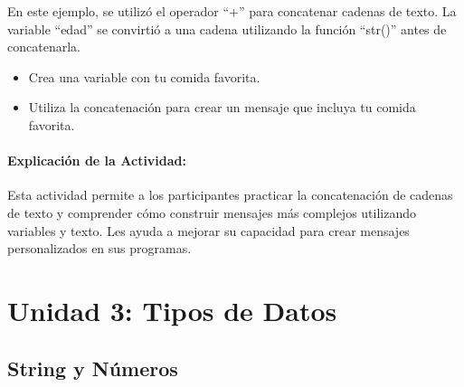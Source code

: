 \documentclass[
  a4paper,
  DIV=11,
  numbers=noendperiod,
  onepage,
  openany]{scrreprt}
\providecommand{\tightlist}{%
  \setlength{\itemsep}{0pt}\setlength{\parskip}{0pt}}\usepackage{longtable,booktabs,array}
\begin{document}
En este ejemplo, se utilizó el operador ``+'' para concatenar cadenas de
texto. La variable ``edad'' se convirtió a una cadena utilizando la
función ``str()'' antes de concatenarla.

\begin{tcolorbox}[enhanced jigsaw, toptitle=1mm, toprule=.15mm, title=\textcolor{quarto-callout-tip-color}{\faLightbulb}\hspace{0.5em}{Actividad Práctica}, colbacktitle=quarto-callout-tip-color!10!white, opacitybacktitle=0.6, titlerule=0mm, colback=white, left=2mm, bottomrule=.15mm, breakable, bottomtitle=1mm, rightrule=.15mm, colframe=quarto-callout-tip-color-frame, arc=.35mm, leftrule=.75mm, coltitle=black, opacityback=0]

\begin{itemize}
\tightlist
\item
  Crea una variable con tu comida favorita.
\item
  Utiliza la concatenación para crear un mensaje que incluya tu comida
  favorita.
\end{itemize}

\end{tcolorbox}

\subsection{Explicación de la
Actividad:}\label{explicaciuxf3n-de-la-actividad-3}

Esta actividad permite a los participantes practicar la concatenación de
cadenas de texto y comprender cómo construir mensajes más complejos
utilizando variables y texto. Les ayuda a mejorar su capacidad para
crear mensajes personalizados en sus programas.

\part{Unidad 3: Tipos de Datos}

\chapter{String y Números}\label{string-y-nuxfameros}
\end{document}
